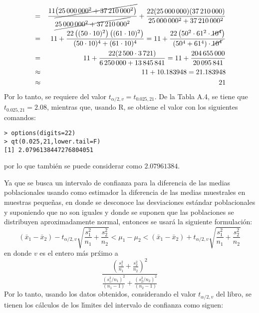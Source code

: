 \begin{solucion}
\begin{eqnarray*}
  & = & \frac{11 \cancel{\left( 25\,000\,000^2 + 37\,210\,000^2 \right)} }{\cancel{ 25\,000\,000^2 + 37\,210\,000^2 }} + \frac{22(25\,000\,000)(37\,210\,000)}{25\,000\,000^2 + 37\,210\,000^2} \\
  & = & 11 + \frac{22\left( (50\cdot 10)^2 \right)\left( (61\cdot 10)^2 \right)}{(50\cdot10)^4 + (61\cdot 10)^4} = 11 + \frac{22\left( 50^2 \cdot 61^2 \cdot \cancel{10^4} \right)}{\left( 50^4 + 61^4 \right)\cdot \cancel{10^4} } \\
  & = & 11 + \frac{22(2\,500 \cdot 3\,721)}{6\,250\,000 + 13\,845\,841} = 11 + \frac{204\,655\,000}{20\,095\,841} \\
  & \approx & 11 + 10.183948 = 21.183948 \\
  & \approx & 21
 \end{eqnarray*}
 Por lo tanto, se requiere del valor $t_{\alpha/2,v} = t_{0.025,21}$. De la Tabla A.4, se tiene que $t_{0.025,21} = 2.08$, mientras que, usando R, se obtiene el valor con los siguientes comandos:
 \begin{verbatim}
> options(digits=22)
> qt(0.025,21,lower.tail=F)
[1] 2.0796138447276804051
 \end{verbatim}
 \vspace{-0.5cm}
 por lo que tambi\'en se puede considerar como $2.07961384$.
 \par 
 Ya que se busca un intervalo de confianza para la diferencia de las medias poblacionales usando como estimador la diferencia de las medias muestrales en muestras peque\~nas, en donde se desconoce las desviaciones est\'andar poblacionales y suponiendo que no son iguales y donde se suponen que las poblaciones se distribuyen aproximadamente normal, entonces se usar\'a la siguiente formulaci\'on:
 \begin{equation*}
  \left( \bar{x}_1 - \bar{x}_2 \right) - t_{\alpha/2,v} \sqrt{\frac{s_1^2}{n_1} + \frac{s_2^2}{n_2}} < \mu_1 - \mu_2 < \left( \bar{x}_1 - \bar{x}_2 \right) + t_{\alpha/2,v} \sqrt{\frac{s_1^2}{n_1} + \frac{s_2^2}{n_2}}
 \end{equation*}
 en donde $v$ es el entero m\'as pr\'ximo a
 \begin{equation*}
  \frac{ \displaystyle{ \left( \frac{s_1^2}{n_1} + \frac{s_2^2}{n_2} \right)^2 } }{ \displaystyle{ \frac{ \left( s_1^2/n_1 \right)^2 }{\left( n_1 - 1 \right)} + \frac{ \left( s_2^2/n_2 \right)^2 }{\left( n_2  - 1\right)}  }}
 \end{equation*}
 Por lo tanto, usando los datos obtenidos, considerando el valor $t_{\alpha/2,v}$ del libro, se tienen los c\'alculos de los l\'{\i}mites del intervalo de confianza como siguen:

\end{solucion}

